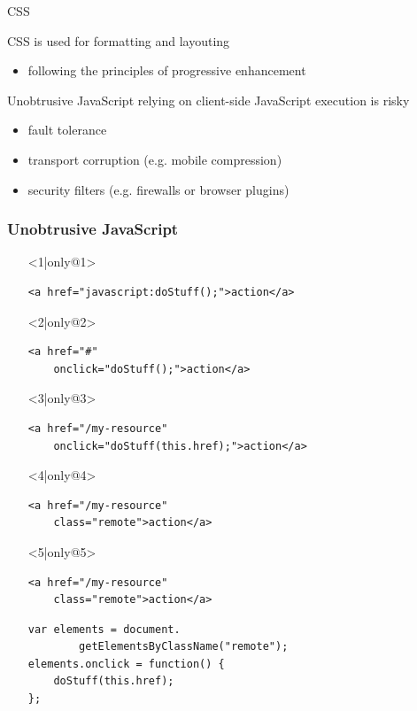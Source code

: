 \documentclass{beamer}
\begin{document}
\begin{frame}{CSS}

  CSS is used for formatting and layouting

  \begin{itemize}
    \item following the principles of progressive enhancement
  \end{itemize}
\end{frame}

\begin{frame}{Unobtrusive JavaScript}
  relying on client-side JavaScript execution is risky

  \begin{itemize}
    \item fault tolerance
    \item transport corruption (e.g. mobile compression)
    \item security filters (e.g. firewalls or browser plugins)
  \end{itemize}
\end{frame}

\begin{frame}[fragile]
  \frametitle{Unobtrusive JavaScript}

  \begin{itemize}
    \item[]<1|only@1> \begin{verbatim}
<a href="javascript:doStuff();">action</a>
    \end{verbatim}
    \item[]<2|only@2> \begin{verbatim}
<a href="#"
    onclick="doStuff();">action</a>
    \end{verbatim}
    \item[]<3|only@3> \begin{verbatim}
<a href="/my-resource"
    onclick="doStuff(this.href);">action</a>
    \end{verbatim}
    \item[]<4|only@4> \begin{verbatim}
<a href="/my-resource"
    class="remote">action</a>
    \end{verbatim}
    \item[]<5|only@5> \begin{verbatim}
<a href="/my-resource"
    class="remote">action</a>
    \end{verbatim}
    \vspace*{0.25cm}
    \begin{verbatim}
var elements = document.
        getElementsByClassName("remote");
elements.onclick = function() {
    doStuff(this.href);
};
    \end{verbatim}
  \end{itemize}
\end{frame}
\end{document}
